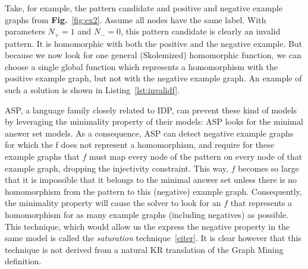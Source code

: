 Take, for example, the pattern candidate and positive and negative example graphs from \textbf{Fig.}~\ref{fig:ex2}.
Assume all nodes have the same label.
With parameters $N_{+}=1$ and $N_{-}=0$, this pattern candidate is clearly an invalid pattern. 
It is homomorphic with both the positive and the negative example.
But because we now look for one general (Skolemized) homomorphic function, we can choose a single global function which represents a homomorphism with the positive example graph, but not with the negative example graph.
An example of such a solution is shown in Listing~\ref{lst:invalidf}.

ASP, a language family closely related to IDP, can prevent these kind of models by leveraging the minimality property of their models: ASP looks for the minimal answer set models.
As a consequence, ASP can detect negative example graphs for which the f does not represent a homomorphism, and 
require for these example graphs that $f$ must map every node of the pattern on every node of that example graph, dropping the injectivity constraint.
This way, $f$ becomes so large that it is impossible that it belongs to the minimal answer set unless there is no homomorphism from the pattern to this (negative) example graph.
Consequently, the minimality property will cause the solver to look for an $f$ that represents a homomorphism for as many example graphs (including negatives) as possible.
This technique, which would allow us the express the negative property in the same model is called the \emph{saturation} technique~\ref{eiter}.
It is clear however that this technique is not derived from a natural KR translation of the Graph Mining definition.

